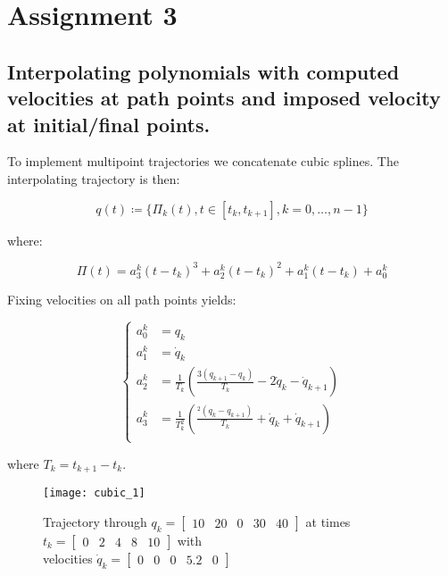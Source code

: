 \section{Assignment 3}
\subsection{Interpolating polynomials with computed velocities at path points and imposed velocity at initial/final points.}

To implement multipoint trajectories we concatenate cubic splines. The interpolating trajectory is then:

\begin{equation*}
q(t)\coloneqq\{\Pi_k(t),t\in[t_k,t_{k+1}],k=0,\dots,n-1\}
\end{equation*}

where:

\begin{equation*}
\Pi(t)=a_3^k(t-t_k)^3+a_2^k(t-t_k)^2+a_1^k(t-t_k)+a_0^k
\end{equation*}

Fixing velocities on all path points yields:

\begin{equation*}
\begin{cases}
a_0^k&=q_k\\
a_1^k&=\dot q_k\\
a_2^k&=\frac{1}{T_k}\left(\frac{3(q_{k+1}-q_k)}{T_k}-2\dot q_k-\dot q_{k+1}\right)\\
a_3^k&=\frac{1}{T_k^2}\left(\frac{^2(q_{k}-q_{k+1})}{T_k}+\dot q_k+\dot q_{k+1}\right)\\
\end{cases}
\end{equation*}

where $T_k=t_{k+1}-t_k$.

\begin{figure}[h]
\centering
\texttt{[image: cubic\_1]}
\caption{Trajectory through $q_k=\begin{bmatrix}
10 & 20 & 0 & 30 & 40
\end{bmatrix}$ at times $t_k=\begin{bmatrix}
0 & 2 & 4 & 8 & 10
\end{bmatrix}$ with \\velocities $\dot q_k=\begin{bmatrix}
0 & 0 & 0 & 5.2 & 0
\end{bmatrix}$}
\end{figure}


